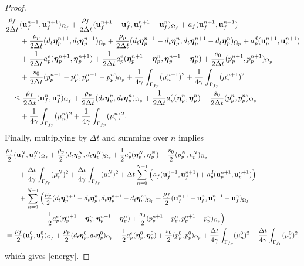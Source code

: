 \documentclass[11pt]{article}
\def\u{{\bf u}}
\def\bbeta{\boldsymbol{\eta}}
\def\O{\Omega}
\def\dt{d_t}
\begin{document}
\begin{proof}
\begin{align*}
& \frac{\rho_f}{2\Delta t} (\u_f^{n+1}, \u_f^{n+1})_{\O_f} + \frac{\rho_f}{2\Delta t} (\u_f^{n+1} - \u_f^{n}, \u_f^{n+1} - \u_f^{n})_{\O_f} + a_{f}(\u_{f}^{n+1},\u_f^{n+1}) \\
& \quad \quad + \frac{\rho_p}{2\Delta t}(\dt\bbeta_{p}^{n+1},\dt\bbeta_{p}^{n+1})_{\O_p}+\frac{\rho_p}{2\Delta t}(\dt\bbeta_{p}^{n+1}-\dt\bbeta_{p}^n,\dt\bbeta_{p}^{n+1}-\dt\bbeta_{p}^n)_{\O_p} + a^d_{p}(\u_{p}^{n+1},\u_{p}^{n+1}) \\
 & \quad \quad 
 + \frac{1}{2\Delta t}a^e_{p}(\bbeta_{p}^{n+1},\bbeta_{p}^{n+1})+
 \frac{1}{2\Delta t} a^e_{p}(\bbeta_{p}^{n+1}-\bbeta_{p}^{n},\bbeta_{p}^{n+1}-\bbeta_{p}^{n})+ \frac{s_0}{2\Delta t}(p_{p}^{n+1},p_p^{n+1})_{\O_p}
  \\
 & \quad \quad + \frac{s_0}{2\Delta t} (p_{p}^{n+1}-p_{p}^{n},p_p^{n+1}-p_{p}^{n})_{\O_p} + \frac{1}{4\gamma}\int_{\Gamma_{fp}} (\mu_n^{n+1})^2 + \frac{1}{4\gamma}\int_{\Gamma_{fp}} (\mu_{\tau}^{n+1})^2\\
 &\quad \le \frac{\rho_f}{2\Delta t} (\u_f^{n}, \u_f^{n})_{\O_f}+ \frac{\rho_p}{2\Delta t}(\dt\bbeta_{p}^n,\dt\bbeta_{p}^n)_{\O_p} + \frac{1}{2\Delta t}a^e_{p}(\bbeta_{p}^{n},\bbeta_{p}^{n}) + \frac{s_0}{2\Delta t} (p_{p}^{n},p_p^{n})_{\O_p}\\
 &\quad \quad +\frac{1}{4\gamma}\int_{\Gamma_{fp}} (\mu_n^{n})^2
  + \frac{1}{4\gamma}\int_{\Gamma_{fp}} (\mu_{\tau}^{n})^2.
\end{align*}
%
Finally, multiplying by $\Delta t$ and summing over $n$ implies
%
\begin{align*}
  & \frac{\rho_f}{2}(\u_f^N,\u_f^N)_{\O_f}+ \frac{\rho_p}{2}(\dt\bbeta_{p}^N,\dt\bbeta_{p}^N)_{\O_p}+ \frac{1}{2}a^e_{p}(\bbeta_{p}^N,\bbeta_{p}^N)+ \frac{s_0}{2} (p_{p}^N,p_p^N)_{\O_p} \\
& \qquad  + \frac{\Delta t}{4\gamma}\int_{\Gamma_{fp}} (\mu_n^N)^2 
  + \frac{\Delta t}{4\gamma}\int_{\Gamma_{fp}} (\mu_{\tau}^N)^2  
  + \Delta t \sum_{n=0}^{N-1}\Big(a_{f}(\u_{f}^{n+1},\u_f^{n+1}) + a^d_{p}(\u_{p}^{n+1},\u_{p}^{n+1})\Big) \\
& \qquad +\sum_{n=0}^{N-1} 
  \Big(\frac{\rho_p}{2}(\dt\bbeta_{p}^{n+1}-\dt\bbeta_{p}^n,\dt\bbeta_{p}^{n+1}-\dt\bbeta_{p}^n)_{\O_p}
  +\frac{\rho_f}{2}(\u_f^{n+1}-\u_f^{n},\u_f^{n+1}-\u_f^{n})_{\O_f}
  \\
  & \quad\qquad\qquad
  +\frac{1}{2} a^e_{p}(\bbeta_{p}^{n+1}-\bbeta_{p}^{n},\bbeta_{p}^{n+1}-\bbeta_{p}^{n})
  + \frac{s_0}{2} (p_{p}^{n+1}-p_{p}^{n},p_p^{n+1}-p_{p}^{n})_{\O_p}\Big) \\
  & =\frac{\rho_f}{2}(\u_f^{0},\u_f^{0})_{\O_f} + \frac{\rho_p}{2}(\dt\bbeta_{p}^0,\dt\bbeta_{p}^0)_{\O_p}+ \frac{1}{2}a^e_{p}(\bbeta_{p}^{0},\bbeta_{p}^{0}) + \frac{s_0}{2} (p_{p}^{0},p_p^{0})_{\O_p}
 +\frac{\Delta t}{4\gamma}\int_{\Gamma_{fp}} (\mu_n^{0})^2
  + \frac{\Delta t}{4\gamma}\int_{\Gamma_{fp}} (\mu_{\tau}^{0})^2.
\end{align*}
%
which gives \eqref{energy}.
\end{proof}
\end{document}
